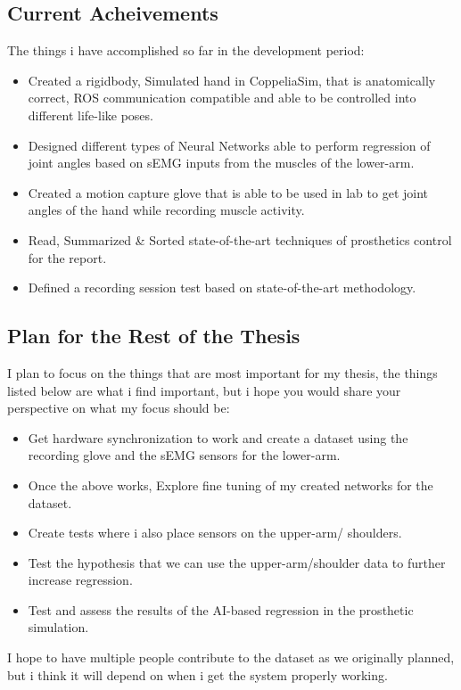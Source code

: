 \documentclass[a4paper, 12pt]{article}
\begin{document}
\subsection{Current Acheivements}

The things i have accomplished so far in the development period:

\begin{itemize}
\item Created a rigidbody, Simulated hand in CoppeliaSim, that is anatomically correct, ROS communication compatible and able to be controlled into different life-like poses.  
\item Designed different types of Neural Networks able to perform regression of joint angles based on sEMG inputs from the muscles of the lower-arm.
\item Created a motion capture glove that is able to be used in lab to get joint angles of the hand while recording muscle activity.
\item Read, Summarized \& Sorted state-of-the-art techniques of prosthetics control for the report. 
\item Defined a recording session test based on state-of-the-art methodology.
\end{itemize}

\subsection{Plan for the Rest of the Thesis}

I plan to focus on the things that are most important for my thesis, the things listed below are what i find important, but i hope you would share your perspective on what my focus should be:

\begin{itemize}
\item Get hardware synchronization to work and create a dataset using the recording glove and the sEMG sensors for the lower-arm.
\item Once the above works, Explore fine tuning of my created networks for the dataset.
\item Create tests where i also place sensors on the upper-arm/ shoulders.
\item Test the hypothesis that we can use the upper-arm/shoulder data to further increase regression.
\item Test and assess the results of the AI-based regression in the prosthetic simulation.
\end{itemize}

I hope to have multiple people contribute to the dataset as we originally planned, but i think it will depend on when i get the system properly working.
\end{document}
